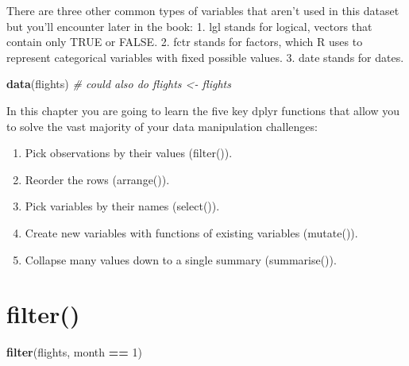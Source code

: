 \documentclass[
]{article}
\newenvironment{Shaded}{\begin{snugshade}}{\end{snugshade}}
\newcommand{\CommentTok}[1]{\textcolor[rgb]{0.56,0.35,0.01}{\textit{#1}}}
\newcommand{\DecValTok}[1]{\textcolor[rgb]{0.00,0.00,0.81}{#1}}
\newcommand{\FunctionTok}[1]{\textcolor[rgb]{0.13,0.29,0.53}{\textbf{#1}}}
\newcommand{\NormalTok}[1]{#1}
\newcommand{\SpecialCharTok}[1]{\textcolor[rgb]{0.81,0.36,0.00}{\textbf{#1}}}
\providecommand{\tightlist}{%
  \setlength{\itemsep}{0pt}\setlength{\parskip}{0pt}}
\begin{document}
There are three other common types of variables that aren't used in this
dataset but you'll encounter later in the book: 1. lgl stands for
logical, vectors that contain only TRUE or FALSE. 2. fctr stands for
factors, which R uses to represent categorical variables with fixed
possible values. 3. date stands for dates.

\begin{Shaded}
\begin{Highlighting}[]
\FunctionTok{data}\NormalTok{(flights)}
\CommentTok{\# could also do flights \textless{}{-} flights}
\end{Highlighting}
\end{Shaded}

In this chapter you are going to learn the five key dplyr functions that
allow you to solve the vast majority of your data manipulation
challenges:

\begin{enumerate}
\def\labelenumi{\arabic{enumi}.}
\tightlist
\item
  Pick observations by their values (filter()).
\item
  Reorder the rows (arrange()).
\item
  Pick variables by their names (select()).
\item
  Create new variables with functions of existing variables (mutate()).
\item
  Collapse many values down to a single summary (summarise()).
\end{enumerate}

\hypertarget{filter}{%
\section{filter()}\label{filter}}

\begin{Shaded}
\begin{Highlighting}[]
\FunctionTok{filter}\NormalTok{(flights, month }\SpecialCharTok{==} \DecValTok{1}\NormalTok{)}
\end{Highlighting}
\end{Shaded}
\end{document}
